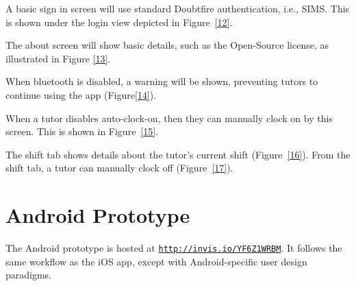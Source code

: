 \documentclass[a4paper,12pt]{article}
\begin{document}
A basic sign in screen will use standard Doubtfire authentication,
i.e., SIMS. This is shown under the login view depicted in Figure~\ref{12}.

The about screen will show basic details, such as the Open-Source
license, as illustrated in Figure \ref{13}.

When bluetooth is disabled, a warning will be shown, preventing tutors to
continue using the app (Figure\ref{14}).

When a tutor disables auto-clock-on, then they can manually clock on by
this screen. This is shown in Figure~\ref{15}.

The shift tab shows details about the tutor's current shift (Figure~\ref{16}).
From the shift tab, a tutor can manually clock off (Figure~\ref{17}).

\section{Android Prototype}\label{android-prototype}

The Android prototype is hosted at \texttt{\url{http://invis.io/YF6Z1WRBM}}. It
follows the same workflow as the iOS app, except with Android-specific user
design paradigms.
\end{document}
